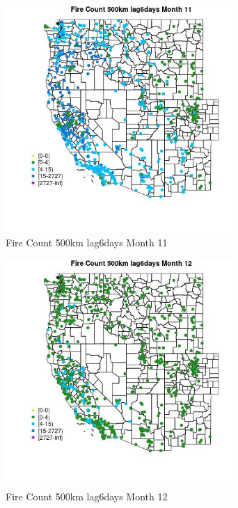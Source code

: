 \begin{figure} 
\centering  
\includegraphics[width=0.77\textwidth]{Code_Outputs/Report_ML_input_PM25_Step4_part_f_de_duplicated_aves_prioritize_24hr_obswNAs_MapObsMo11Fire_Count_500km_lag6days.jpg} 
\caption{\label{fig:Report_ML_input_PM25_Step4_part_f_de_duplicated_aves_prioritize_24hr_obswNAsMapObsMo11Fire_Count_500km_lag6days}Fire Count 500km lag6days Month 11} 
\end{figure} 
 

\begin{figure} 
\centering  
\includegraphics[width=0.77\textwidth]{Code_Outputs/Report_ML_input_PM25_Step4_part_f_de_duplicated_aves_prioritize_24hr_obswNAs_MapObsMo12Fire_Count_500km_lag6days.jpg} 
\caption{\label{fig:Report_ML_input_PM25_Step4_part_f_de_duplicated_aves_prioritize_24hr_obswNAsMapObsMo12Fire_Count_500km_lag6days}Fire Count 500km lag6days Month 12} 
\end{figure} 
 

